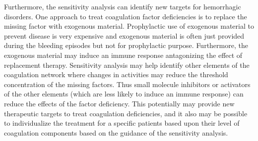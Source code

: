 Furthermore, the sensitivity analysis can identify new targets for
hemorrhagic disorders. One approach to treat coagulation factor
deficiencies is to replace the missing factor with exogenous
material. Prophylactic use of exogenous material to prevent disease
is very expensive and exogenous material is often just provided
during the bleeding episodes but not for prophylactic purpose.
Furthermore, the exogenous material may induce an immune response
antagonizing the effect of replacement therapy. Sensitivity analysis
may help identify other elements of the coagulation network where
changes in activities may reduce the threshold concentration of the
missing factors. Thus small molecule inhibitors or activators of the
other elements (which are less likely to induce an immune response)
can reduce the effects of the factor deficiency. This potentially
may provide new therapeutic targets to treat coagulation
deficiencies, and it also may be possible to individualize the
treatment for a specific patients based upon their level of
coagulation components based on the guidance of the sensitivity
analysis.
